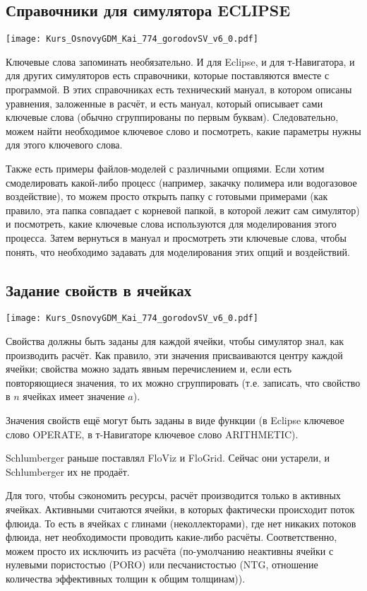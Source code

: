 \documentclass[main.tex]{subfiles}
\begin{document}
\subsection{Справочники для симулятора ECLIPSE}

\texttt{[image: Kurs\_OsnovyGDM\_Kai\_774\_gorodovSV\_v6\_0.pdf]}

Ключевые слова запоминать необязательно.
И для Eclipse, и для т-Навигатора, и для других симуляторов есть справочники, которые поставляются вместе с программой.
В этих справочниках есть технический мануал, в котором описаны уравнения, заложенные в расчёт, и есть мануал, который описывает сами ключевые слова (обычно сгруппированы по первым буквам).
Следовательно, можем найти необходимое ключевое слово и посмотреть, какие параметры нужны для этого ключевого слова.

Также есть примеры файлов-моделей с различными опциями.
Если хотим смоделировать какой-либо процесс (например, закачку полимера или водогазовое воздействие), то можем просто открыть папку с готовыми примерами (как правило, эта папка совпадает с корневой папкой, в которой лежит сам симулятор) и посмотреть, какие ключевые слова используются для моделирования этого процесса.
Затем вернуться в мануал и просмотреть эти ключевые слова, чтобы понять, что необходимо задавать для моделирования этих опций и воздействий.

\subsection{Задание свойств в ячейках}

\texttt{[image: Kurs\_OsnovyGDM\_Kai\_774\_gorodovSV\_v6\_0.pdf]}

Свойства должны быть заданы для каждой ячейки, чтобы симулятор знал, как производить расчёт.
Как правило, эти значения присваиваются центру каждой ячейки; свойства можно задать явным перечислением и, если есть повторяющиеся значения, то их можно сгруппировать (т.е. записать, что свойство в $n$ ячейках имеет значение $a$).

Значения свойств ещё могут быть заданы в виде функции (в Eclipse ключевое слово OPERATE, в т-Навигаторе ключевое слово ARITHMETIC).

Schlumberger раньше поставлял FloViz и FloGrid. Сейчас они устарели, и Schlumberger их не продаёт.

Для того, чтобы сэкономить ресурсы, расчёт производится только в активных ячейках.
Активными считаются ячейки, в которых фактически происходит поток флюида.
То есть в ячейках с глинами (неколлекторами), где нет никаких потоков флюида, нет необходимости проводить какие-либо расчёты.
Соответственно, можем просто их исключить из расчёта (по-умолчанию неактивны ячейки с нулевыми пористостью (PORO) или песчанистостью (NTG, отношение количества эффективных толщин к общим толщинам)).
\end{document}
